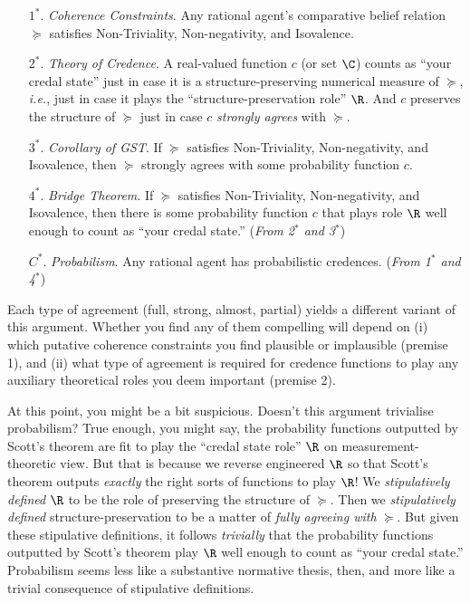 \begin{enumerate}
\item[$1^*$.] \textit{Coherence Constraints}. Any rational agent's comparative belief relation $\succeq$ satisfies Non-Triviality, Non-negativity, and Isovalence.
\item[$2^*$.] \textit{Theory of Credence}. A real-valued function $c$ (or set $\C$) counts as ``your credal state'' just in case it is a structure-preserving numerical measure of $\succeq$, \textit{i.e.}, just in case it plays the ``structure-preservation role'' $\R$. And $c$ preserves the structure of $\succeq$ just in case $c$ \textit{strongly agrees} with $\succeq$.	
\item[$3^*$.] \textit{Corollary of GST}. If $\succeq$ satisfies Non-Triviality, Non-negativity, and Isovalence, then $\succeq$ strongly agrees with some probability function $c$.
\item[$4^*$.] \textit{Bridge Theorem}. If $\succeq$ satisfies Non-Triviality, Non-negativity, and Isovalence, then there is some probability function $c$ that plays role $\R$ well enough to count as ``your credal state.'' (\textit{From 2$^*$ and 3$^*$})
\item[$C^*$.]\textit{Probabilism}. Any rational agent has probabilistic credences. (\textit{From 1$^*$ and 4$^*$})
\end{enumerate}
Each type of agreement (full, strong, almost, partial) yields a different variant of this argument. Whether you find any of them compelling will depend on (i) which putative coherence constraints you find plausible or implausible (premise 1), and (ii) what type of agreement is required for credence functions to play any auxiliary theoretical roles you deem important (premise 2).

At this point, you might be a bit suspicious. Doesn't this argument trivialise probabilism? True enough, you might say, the probability functions outputted by Scott's theorem are fit to play the ``credal state role'' $\R$ on measurement-theoretic view. But that is because we reverse engineered $\R$ so that Scott's theorem outputs \textit{exactly} the right sorts of functions to play $\R$! We \textit{stipulatively defined} $\R$ to be the role of preserving the structure of $\succeq$. Then we \textit{stipulatively defined} structure-preservation to be a matter of \textit{fully agreeing with} $\succeq$. But given these stipulative definitions, it follows \textit{trivially} that the probability functions outputted by Scott's theorem play $\R$ well enough to count as ``your credal state.'' Probabilism seems less like a substantive normative thesis, then, and more like a trivial consequence of stipulative definitions.


